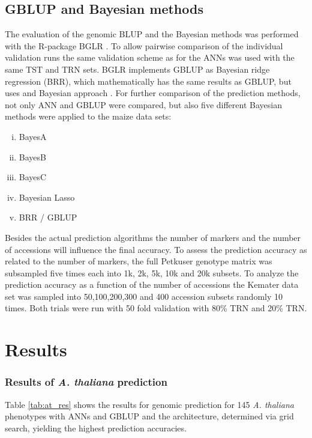 \subsection{GBLUP and Bayesian methods} \label{met:blup:bayes}

The evaluation of the genomic BLUP and the Bayesian methods was performed with the
R-package BGLR \cite{BGLR}. To allow pairwise comparison of the individual validation runs
the same validation scheme as for the ANNs was used with the same TST and TRN sets. BGLR
implements GBLUP as Bayesian ridge regression (BRR), which mathematically has the same
results as GBLUP, but uses and Bayesian approach \cite{BGLR}. For further comparison of
the prediction methods, not only ANN and GBLUP were compared, but also five different
Bayesian methods were applied to the maize data sets:

\onehalfspacing
\begin{enumerate}[(i)]
\item BayesA
\item BayesB
\item BayesC
\item Bayesian Lasso
\item BRR / GBLUP
\end{enumerate}
\doublespacing

Besides the actual prediction algorithms the number of markers and the number of
accessions will influence the final accuracy. To assess the prediction accuracy as related
to the number of markers, the full Petkuser genotype matrix was subsampled five times each into 1k,
2k, 5k, 10k and 20k subsets. To analyze the prediction accuracy as a function of the
number of accessions the Kemater data set was sampled into 50,100,200,300 and 400
accession subsets  randomly 10 times. Both trials were run with 50 fold validation
with 80\% TRN and 20\% TRN. 



\section{Results} \label{res:gp}
\subsubsection{Results of \textit{A. thaliana} prediction} \label{res:gp:at} Table
\ref{tab:at_res} shows the results for genomic prediction for 145 \textit{A. thaliana}
phenotypes with ANNs and GBLUP and the architecture, determined via grid search, yielding
the highest prediction accuracies.

